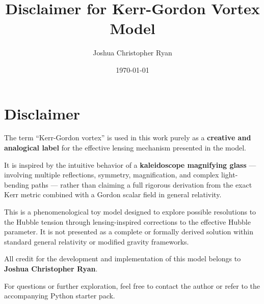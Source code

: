 \documentclass[11pt,a4paper]{article}
\title{Disclaimer for Kerr-Gordon Vortex Model}
\author{Joshua Christopher Ryan}
\date{\today}
\begin{document}
\maketitle

\section{Disclaimer}

The term ``Kerr-Gordon vortex'' is used in this work purely as a \textbf{creative and analogical label} for the effective lensing mechanism presented in the model.

It is inspired by the intuitive behavior of a \textbf{kaleidoscope magnifying glass} — involving multiple reflections, symmetry, magnification, and complex light-bending paths — rather than claiming a full rigorous derivation from the exact Kerr metric combined with a Gordon scalar field in general relativity.

This is a phenomenological toy model designed to explore possible resolutions to the Hubble tension through lensing-inspired corrections to the effective Hubble parameter. It is not presented as a complete or formally derived solution within standard general relativity or modified gravity frameworks.

All credit for the development and implementation of this model belongs to \textbf{Joshua Christopher Ryan}.

\vspace{1cm}
For questions or further exploration, feel free to contact the author or refer to the accompanying Python starter pack.
\end{document}

